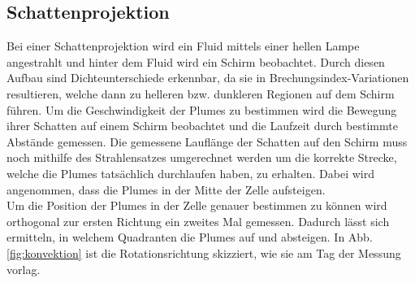 \documentclass[12pt,a4paper,titlepage,headinclude]{scrartcl}
\numberwithin{equation}{subsection}
\begin{document}
\subsection{Schattenprojektion}
\label{sec:schattenproj}
Bei einer Schattenprojektion wird ein Fluid mittels einer hellen Lampe angestrahlt und hinter dem Fluid wird ein Schirm beobachtet.
Durch diesen Aufbau sind Dichteunterschiede erkennbar, da sie in Brechungsindex-Variationen resultieren, welche dann zu helleren bzw. dunkleren Regionen auf dem Schirm führen.
Um die Geschwindigkeit der Plumes zu bestimmen wird die Bewegung ihrer Schatten auf einem Schirm beobachtet und die Laufzeit durch bestimmte Abstände gemessen.
Die gemessene Lauflänge der Schatten auf den Schirm muss noch mithilfe des Strahlensatzes umgerechnet werden um die korrekte Strecke, welche die Plumes tatsächlich durchlaufen haben, zu erhalten.
Dabei wird angenommen, dass die Plumes in der Mitte der Zelle aufsteigen.\\

Um die Position der Plumes in der Zelle genauer bestimmen zu können wird orthogonal zur ersten Richtung ein zweites Mal gemessen.
Dadurch lässt sich ermitteln, in welchem Quadranten die Plumes auf und absteigen.
In Abb. \ref{fig:konvektion} ist die Rotationsrichtung skizziert, wie sie am Tag der Messung vorlag.
\end{document}
